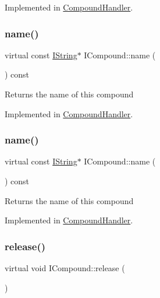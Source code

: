 Implemented in \mbox{\hyperlink{class_compound_handler_afc374b0797b025ba660c558ca1d73137}{Compound\+Handler}}.

\mbox{\label{class_i_compound_ae14b5dcf513ef0d263119aeb2e2ffb15}} 
\subsubsection{\texorpdfstring{name()}{name()}\hspace{0.1cm}{\footnotesize\ttfamily [1/2]}}
{\footnotesize\ttfamily virtual const \mbox{\hyperlink{class_i_string}{I\+String}}$\ast$ I\+Compound\+::name (\begin{DoxyParamCaption}{ }\end{DoxyParamCaption}) const\hspace{0.3cm}{\ttfamily [pure virtual]}}

Returns the name of this compound 

Implemented in \mbox{\hyperlink{class_compound_handler_ac7c192318d397bf053bb3ee44903aca7}{Compound\+Handler}}.

\mbox{\label{class_i_compound_ae14b5dcf513ef0d263119aeb2e2ffb15}} 
\subsubsection{\texorpdfstring{name()}{name()}\hspace{0.1cm}{\footnotesize\ttfamily [2/2]}}
{\footnotesize\ttfamily virtual const \mbox{\hyperlink{class_i_string}{I\+String}}$\ast$ I\+Compound\+::name (\begin{DoxyParamCaption}{ }\end{DoxyParamCaption}) const\hspace{0.3cm}{\ttfamily [pure virtual]}}

Returns the name of this compound 

Implemented in \mbox{\hyperlink{class_compound_handler_ac7c192318d397bf053bb3ee44903aca7}{Compound\+Handler}}.

\mbox{\label{class_i_compound_a5388c74d390323ce610f752a01456b21}} 
\subsubsection{\texorpdfstring{release()}{release()}\hspace{0.1cm}{\footnotesize\ttfamily [1/2]}}
{\footnotesize\ttfamily virtual void I\+Compound\+::release (\begin{DoxyParamCaption}{ }\end{DoxyParamCaption})\hspace{0.3cm}{\ttfamily [pure virtual]}}


